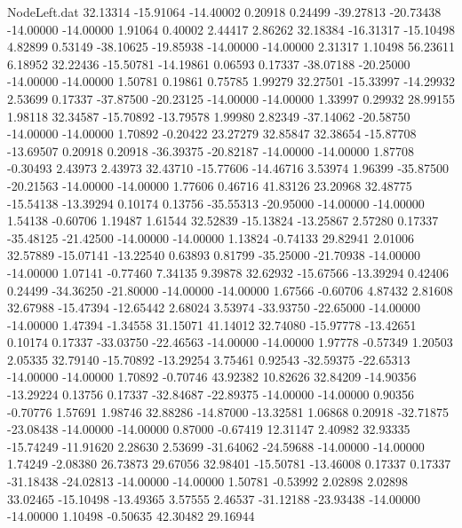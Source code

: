 \begin{filecontents}{NodeLeft.dat}
  32.13314  -15.91064  -14.40002     0.20918    0.24499  -39.27813  -20.73438  -14.00000  -14.00000    1.91064    0.40002    2.44417    2.86262
  32.18384  -16.31317  -15.10498     4.82899    0.53149  -38.10625  -19.85938  -14.00000  -14.00000    2.31317    1.10498   56.23611    6.18952
  32.22436  -15.50781  -14.19861     0.06593    0.17337  -38.07188  -20.25000  -14.00000  -14.00000    1.50781    0.19861    0.75785    1.99279
  32.27501  -15.33997  -14.29932     2.53699    0.17337  -37.87500  -20.23125  -14.00000  -14.00000    1.33997    0.29932   28.99155    1.98118
  32.34587  -15.70892  -13.79578     1.99980    2.82349  -37.14062  -20.58750  -14.00000  -14.00000    1.70892   -0.20422   23.27279   32.85847
  32.38654  -15.87708  -13.69507     0.20918    0.20918  -36.39375  -20.82187  -14.00000  -14.00000    1.87708   -0.30493    2.43973    2.43973
  32.43710  -15.77606  -14.46716     3.53974    1.96399  -35.87500  -20.21563  -14.00000  -14.00000    1.77606    0.46716   41.83126   23.20968
  32.48775  -15.54138  -13.39294     0.10174    0.13756  -35.55313  -20.95000  -14.00000  -14.00000    1.54138   -0.60706    1.19487    1.61544
  32.52839  -15.13824  -13.25867     2.57280    0.17337  -35.48125  -21.42500  -14.00000  -14.00000    1.13824   -0.74133   29.82941    2.01006
  32.57889  -15.07141  -13.22540     0.63893    0.81799  -35.25000  -21.70938  -14.00000  -14.00000    1.07141   -0.77460    7.34135    9.39878
  32.62932  -15.67566  -13.39294     0.42406    0.24499  -34.36250  -21.80000  -14.00000  -14.00000    1.67566   -0.60706    4.87432    2.81608
  32.67988  -15.47394  -12.65442     2.68024    3.53974  -33.93750  -22.65000  -14.00000  -14.00000    1.47394   -1.34558   31.15071   41.14012
  32.74080  -15.97778  -13.42651     0.10174    0.17337  -33.03750  -22.46563  -14.00000  -14.00000    1.97778   -0.57349    1.20503    2.05335
  32.79140  -15.70892  -13.29254     3.75461    0.92543  -32.59375  -22.65313  -14.00000  -14.00000    1.70892   -0.70746   43.92382   10.82626
  32.84209  -14.90356  -13.29224     0.13756    0.17337  -32.84687  -22.89375  -14.00000  -14.00000    0.90356   -0.70776    1.57691    1.98746
  32.88286  -14.87000  -13.32581     1.06868    0.20918  -32.71875  -23.08438  -14.00000  -14.00000    0.87000   -0.67419   12.31147    2.40982
  32.93335  -15.74249  -11.91620     2.28630    2.53699  -31.64062  -24.59688  -14.00000  -14.00000    1.74249   -2.08380   26.73873   29.67056
  32.98401  -15.50781  -13.46008     0.17337    0.17337  -31.18438  -24.02813  -14.00000  -14.00000    1.50781   -0.53992    2.02898    2.02898
  33.02465  -15.10498  -13.49365     3.57555    2.46537  -31.12188  -23.93438  -14.00000  -14.00000    1.10498   -0.50635   42.30482   29.16944

\end{filecontents}
